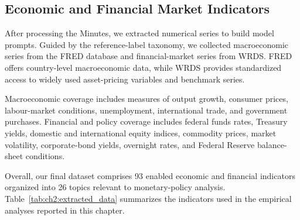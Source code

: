     

\subsection*{Economic and Financial Market Indicators}


After processing the Minutes, we extracted numerical series to build model prompts. Guided by the reference-label taxonomy, we collected macroeconomic series from the FRED database and financial-market series from WRDS. FRED offers country-level macroeconomic data, while WRDS provides standardized access to widely used asset-pricing variables and benchmark series.


Macroeconomic coverage includes measures of output growth, consumer prices, labour-market conditions, unemployment, international trade, and government purchases. Financial and policy coverage includes federal funds rates, Treasury yields, domestic and international equity indices, commodity prices, market volatility, corporate-bond yields, overnight rates, and Federal Reserve balance-sheet conditions.


Overall, our final dataset comprises 93 enabled economic and financial indicators organized into 26 topics relevant to monetary-policy analysis. Table~\ref{tab:ch2:extracted_data} summarizes the indicators used in the empirical analyses reported in this chapter.

